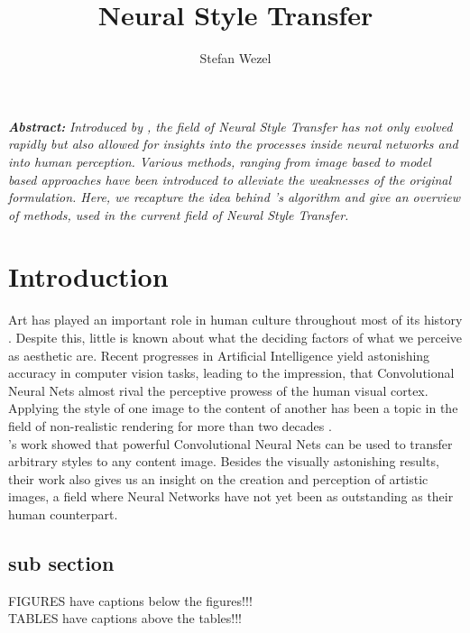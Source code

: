 \documentclass{seminar}
\begin{document}
\renewcommand\toptitle{Seminar: ,,Current Topics in Deep Neural Networks``}
\title{Neural Style Transfer}
\author{Stefan Wezel}
\maketitle


\addvspace{0.5cm}
\emph{\bfseries{Abstract:}}
\emph{Introduced by \cite{gatys2015neural}, the field of Neural Style Transfer has not only evolved rapidly but also allowed for insights into the processes inside neural networks and into human perception. Various methods, ranging from image based to model based approaches have been introduced to alleviate the weaknesses of the original formulation. Here, we recapture the idea behind \cite{gatys2015neural}'s algorithm and give an overview of methods, used in the current field of Neural Style Transfer.}


\tableofcontents
\newpage

\section{Introduction}
Art has played an important role in human culture throughout most of its history \cite{carroll2004art}. Despite this, little is known about what the deciding factors of what we perceive as aesthetic are. Recent progresses in Artificial Intelligence yield astonishing accuracy in computer vision tasks, leading to the impression, that Convolutional Neural Nets almost rival the perceptive prowess of the human visual cortex.
\\ 
Applying the style of one image to the content of another has been a topic in the field of non-realistic rendering for more than two decades \cite{jing2019neural}.
\\
\cite{gatys2015neural}'s work showed that powerful Convolutional Neural Nets can be used to transfer arbitrary styles to any content image. Besides the visually astonishing results, their work also gives us an insight on the creation and perception of artistic images, a field where Neural Networks have not yet been as outstanding as their human counterpart.\\





\subsection{sub section}
FIGURES have captions below the figures!!!\\
TABLES have captions above the tables!!!\\
\end{document}

